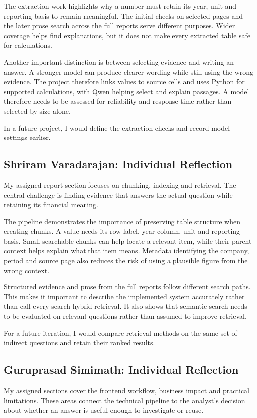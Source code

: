 The extraction work highlights why a number must retain its year, unit and reporting basis to remain meaningful. The initial checks on selected pages and the later prose search across the full reports serve different purposes. Wider coverage helps find explanations, but it does not make every extracted table safe for calculations.

Another important distinction is between selecting evidence and writing an answer. A stronger model can produce clearer wording while still using the wrong evidence. The project therefore links values to source cells and uses Python for supported calculations, with Qwen helping select and explain passages. A model therefore needs to be assessed for reliability and response time rather than selected by size alone.

In a future project, I would define the extraction checks and record model settings earlier.

\subsection{Shriram Varadarajan: Individual Reflection}
My assigned report section focuses on chunking, indexing and retrieval. The central challenge is finding evidence that answers the actual question while retaining its financial meaning.

The pipeline demonstrates the importance of preserving table structure when creating chunks. A value needs its row label, year column, unit and reporting basis. Small searchable chunks can help locate a relevant item, while their parent context helps explain what that item means. Metadata identifying the company, period and source page also reduces the risk of using a plausible figure from the wrong context.

Structured evidence and prose from the full reports follow different search paths. This makes it important to describe the implemented system accurately rather than call every search hybrid retrieval. It also shows that semantic search needs to be evaluated on relevant questions rather than assumed to improve retrieval.

For a future iteration, I would compare retrieval methods on the same set of indirect questions and retain their ranked results.

\subsection{Guruprasad Simimath: Individual Reflection}
My assigned sections cover the frontend workflow, business impact and practical limitations. These areas connect the technical pipeline to the analyst's decision about whether an answer is useful enough to investigate or reuse.

